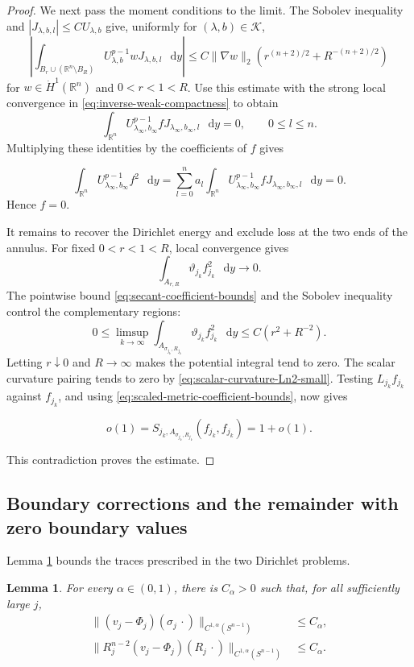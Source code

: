 \documentclass[11pt]{article}
\numberwithin{equation}{section}
\newtheorem{lemma}[theorem]{Lemma}
\theoremstyle{remark}
\newcommand{\R}{\mathbb R}
\newcommand{\Sph}{S}
\newcommand{\norm}[1]{\lVert #1\rVert}
\newcommand{\dd}{\mathop{}\!\mathrm{d}}
\begin{document}
\begin{proof}
We next pass the moment conditions to the limit.
The Sobolev inequality and \(|J_{\lambda,b,l}|\le CU_{\lambda,b}\)
give, uniformly for \((\lambda,b)\in\mathcal K\),
\[
 \left|\int_{B_r\cup(\R^n\setminus B_R)}
 U_{\lambda,b}^{p-1}wJ_{\lambda,b,l}\,\dd y\right|
 \le C\|\nabla w\|_2
 \left(r^{(n+2)/2}+R^{-(n+2)/2}\right)
\]
for \(w\in\dot H^1(\R^n)\) and \(0<r<1<R\).
Use this estimate with the strong local convergence in
\eqref{eq:inverse-weak-compactness} to obtain
\[
 \int_{\R^n}U_{\lambda_\infty,b_\infty}^{p-1}
 fJ_{\lambda_\infty,b_\infty,l}\,\dd y=0,
 \qquad 0\le l\le n.
\]
Multiplying these identities by the coefficients of \(f\) gives
 
\[
 \int_{\R^n}U_{\lambda_\infty,b_\infty}^{p-1}f^2\,\dd y
 =\sum_{l=0}^na_l
\int_{\R^n}U_{\lambda_\infty,b_\infty}^{p-1}
fJ_{\lambda_\infty,b_\infty,l}\,\dd y
 =0.
\]
Hence \(f=0\).

It remains to recover the Dirichlet energy and exclude loss at the two
ends of the annulus.
For fixed \(0<r<1<R\), local convergence gives
\[
 \int_{A_{r,R}}\vartheta_{j_k}f_{j_k}^2\,\dd y\to0.
\]
The pointwise bound \eqref{eq:secant-coefficient-bounds} and the Sobolev
inequality control the complementary regions:
\[
 0\le\limsup_{k\to\infty}
 \int_{A_{\sigma_{j_k},R_{j_k}}}\vartheta_{j_k}f_{j_k}^2\,\dd y
 \le C(r^2+R^{-2}).
\]
Letting \(r\downarrow0\) and \(R\to\infty\) makes the potential integral
tend to zero. The scalar curvature pairing tends to zero by
\eqref{eq:scalar-curvature-Ln2-small}. Testing
 \( L_{j_k}f_{j_k}\) against \(f_{j_k}\), and using
\eqref{eq:scaled-metric-coefficient-bounds}, now gives
 
\[
 o(1)= S_{j_k,A_{\sigma_{j_k},R_{j_k}}}(f_{j_k},f_{j_k})
 =1+o(1).
\]

This contradiction proves the estimate.
\end{proof}

\par
\subsection{Boundary corrections and the remainder with zero boundary values}

Lemma  \ref{lem:annular-boundary-traces} bounds the traces prescribed in the
two Dirichlet problems.

\par

\par

\par
\begin{lemma}\label{lem:annular-boundary-traces}
For every \(\alpha\in(0,1)\), there is \(C_\alpha>0\) such that, for all
sufficiently large \(j\),
\begin{equation}\label{eq:annular-boundary-traces}
 \begin{aligned}
 \norm{(v_j-\Phi_j)(\sigma_j\,\cdot)}_{C^{1,\alpha}(\Sph^{n-1})}
 &\le C_\alpha,\\
 \norm{R_j^{n-2}(v_j-\Phi_j)(R_j\,\cdot)}_{C^{1,\alpha}(\Sph^{n-1})}
 &\le C_\alpha.
 \end{aligned}
\end{equation}
\end{lemma}
\end{document}
